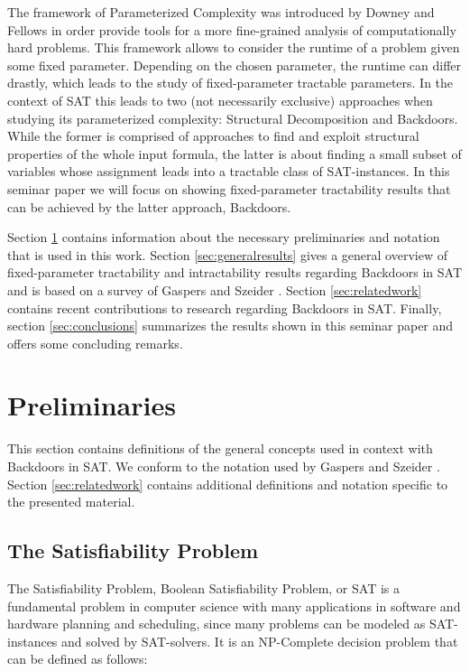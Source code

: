 \documentclass[11pt,a4paper]{article}
\makeatletter
\newcommand{\problemtitle}[1]{\gdef\@problemtitle{#1}}%
\newcommand{\probleminput}[1]{\gdef\@probleminput{#1}}%
\newcommand{\problemquestion}[1]{\gdef\@problemquestion{#1}}%
\theoremstyle{definition}
\makeatother
\begin{document}
The framework of Parameterized Complexity was introduced by Downey and Fellows \cite{downeyFellows} in order provide tools for a more fine-grained analysis of computationally hard problems. This framework allows to consider the runtime of a problem given some fixed parameter. Depending on the chosen parameter, the runtime can differ drastly, which leads to the study of fixed-parameter tractable parameters. In the context of SAT this leads to two (not necessarily exclusive) approaches when studying its parameterized complexity: Structural Decomposition and Backdoors. While the former is comprised of approaches to find and exploit structural properties of the whole input formula, the latter is about finding a small subset of variables whose assignment leads into a tractable class of SAT-instances. In this seminar paper we will focus on showing fixed-parameter tractability results that can be achieved by the latter approach, Backdoors. 

Section \ref{sec:preliminaries} contains information about the necessary preliminaries and notation that is used in this work. Section \ref{sec:generalresults} gives a general overview of fixed-parameter tractability and intractability results regarding Backdoors in SAT and is based on a survey of Gaspers and Szeider \cite{Gaspers2012}. Section \ref{sec:relatedwork} contains recent contributions to research regarding Backdoors in SAT. Finally, section \ref{sec:conclusions} summarizes the results shown in this seminar paper and offers some concluding remarks. 



\section{Preliminaries}
\label{sec:preliminaries}
This section contains definitions of the general concepts used in context with Backdoors in SAT. We conform to the notation used by Gaspers and Szeider \cite{Gaspers2012}. Section \ref{sec:relatedwork} contains additional definitions and notation specific to the presented material. 
\subsection{The Satisfiability Problem}
The Satisfiability Problem, Boolean Satisfiability Problem, or SAT is a fundamental problem in computer science with many applications in software and hardware planning and scheduling, since many problems can be modeled as SAT-instances and solved by SAT-solvers. It is an NP-Complete decision problem that can be defined as follows: 
\begin{csproblem}
\problemtitle{SAT}
\probleminput{A propositional logic formula $F$ in conjunctive normal form (CNF) over propositional variables $X = \{x_1, x_2, ... , x_n\}$}
\problemquestion{Is there a truth assignment $\tau: X \to \{0,1\}$ (or $\tau \in 2^X$) such that $F[\tau]$ evaluates to $1$?}
\end{csproblem}
\end{document}
